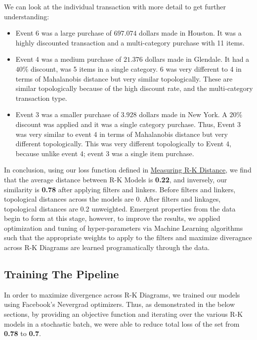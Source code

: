 We can look at the individual transaction with more detail to get further understanding:

\begin{itemize}
\item Event 6 was a large purchase of $697.074$ dollars made in Houston. It was a highly discounted transaction and a multi-category purchase with 11 items.
\item Event 4 was a medium purchase of $21.376$ dollars made in Glendale. It had a $40$\% discount, was 5 items in a single category. 6 was very different to 4 in terms of Mahalanobis distance but very similar topologically. These are similar topologically because of the high discount rate, and the multi-category transaction type.
\item Event 3 was a smaller purchase of $3.928$ dollars made in New York. A $20$\% discount was applied and it was a single category purchase. Thus, Event 3 was very similar to event 4 in terms of Mahalanobis distance but very different topologically. This was very different topologically to Event 4, because unlike event 4; event 3 was a single item purchase.
\end{itemize}

In conclusion, using our loss function defined in \hyperref[sec:rk_distance]{Measuring R-K Distance}, we find that the average distance between R-K Models is \textbf{0.22}, and inversely, our similarity is \textbf{0.78} after applying filters and linkers. Before filters and linkers, topological distances across the models are 0. After filters and linkages, topological distances are 0.2 unweighted. Emergent properties from the data begin to form at this stage, however, to improve the results, we applied optimization and tuning of hyper-parameters via Machine Learning algorithms such that the appropriate weights to apply to the filters and maximize diveragnce across R-K Diagrams are learned programatically through the data.

\subsection{Training The Pipeline}

In order to maximize divergence across R-K Diagrams, we trained our models using Facebook's Nevergrad \cite{a2020_nevergrad} optimizers. Thus, as demonstrated in the below sections, by providing an objective function and iterating over the various R-K models in a stochastic batch, we were able to reduce total loss of the set from \textbf{0.78} to \textbf{0.7}.

